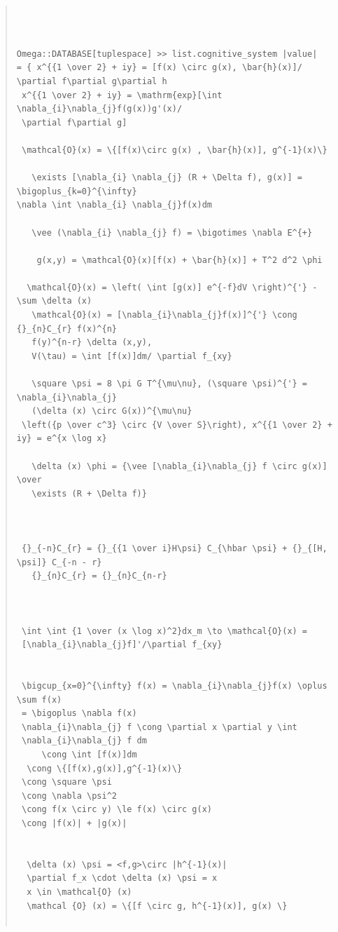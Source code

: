 \documentclass{jsarticle}
\begin{document}
\begin{quote}
\setlength{\baselineskip}{12pt}
\begin{verbatim}



Omega::DATABASE[tuplespace] >> list.cognitive_system |value| 
= { x^{{1 \over 2} + iy} = [f(x) \circ g(x), \bar{h}(x)]/ \partial f\partial g\partial h 
 x^{{1 \over 2} + iy} = \mathrm{exp}[\int \nabla_{i}\nabla_{j}f(g(x))g'(x)/
 \partial f\partial g] 

 \mathcal{O}(x) = \{[f(x)\circ g(x) , \bar{h}(x)], g^{-1}(x)\} 

   \exists [\nabla_{i} \nabla_{j} (R + \Delta f), g(x)] = \bigoplus_{k=0}^{\infty}
\nabla \int \nabla_{i} \nabla_{j}f(x)dm 

   \vee (\nabla_{i} \nabla_{j} f) = \bigotimes \nabla E^{+} 

    g(x,y) = \mathcal{O}(x)[f(x) + \bar{h}(x)] + T^2 d^2 \phi 

  \mathcal{O}(x) = \left( \int [g(x)] e^{-f}dV \right)^{'} - \sum \delta (x) 
   \mathcal{O}(x) = [\nabla_{i}\nabla_{j}f(x)]^{'} \cong {}_{n}C_{r} f(x)^{n} 
   f(y)^{n-r} \delta (x,y), 
   V(\tau) = \int [f(x)]dm/ \partial f_{xy} 

   \square \psi = 8 \pi G T^{\mu\nu}, (\square \psi)^{'} = \nabla_{i}\nabla_{j}
   (\delta (x) \circ G(x))^{\mu\nu}
 \left({p \over c^3} \circ {V \over S}\right), x^{{1 \over 2} + iy} = e^{x \log x} 

   \delta (x) \phi = {\vee [\nabla_{i}\nabla_{j} f \circ g(x)] \over 
   \exists (R + \Delta f)} 



 {}_{-n}C_{r} = {}_{{1 \over i}H\psi} C_{\hbar \psi} + {}_{[H, \psi]} C_{-n - r} 
   {}_{n}C_{r} = {}_{n}C_{n-r} 



 \int \int {1 \over (x \log x)^2}dx_m \to \mathcal{O}(x) = 
 [\nabla_{i}\nabla_{j}f]'/\partial f_{xy}


 \bigcup_{x=0}^{\infty} f(x) = \nabla_{i}\nabla_{j}f(x) \oplus \sum f(x) 
 = \bigoplus \nabla f(x) 
 \nabla_{i}\nabla_{j} f \cong \partial x \partial y \int 
 \nabla_{i}\nabla_{j} f dm 
     \cong \int [f(x)]dm 
  \cong \{[f(x),g(x)],g^{-1}(x)\} 
 \cong \square \psi  
 \cong \nabla \psi^2 
 \cong f(x \circ y) \le f(x) \circ g(x)
 \cong |f(x)| + |g(x)| 


  \delta (x) \psi = <f,g>\circ |h^{-1}(x)| 
  \partial f_x \cdot \delta (x) \psi = x 
  x \in \mathcal{O} (x) 
  \mathcal {O} (x) = \{[f \circ g, h^{-1}(x)], g(x) \} 


\end{verbatim}
\end{quote}
\end{document}
